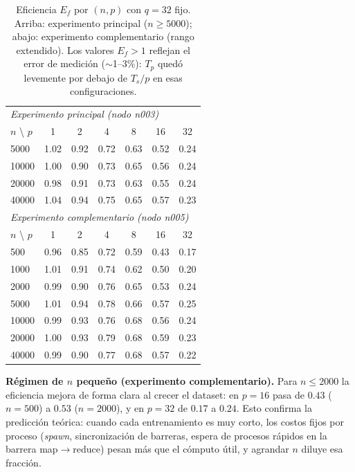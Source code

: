 \documentclass[11pt, a4paper]{article}
\begin{document}
\begin{table}[H]
\centering
\caption{Eficiencia $E_f$ por $(n, p)$ con $q = 32$ fijo. Arriba: experimento principal ($n \ge 5000$); abajo: experimento complementario (rango extendido). Los valores $E_f > 1$ reflejan el error de medición ($\sim$1--3\%): $T_p$ quedó levemente por debajo de $T_s/p$ en esas configuraciones.}
\label{tab:ef_n}
\small
\begin{tabular}{lcccccc}
\toprule
\multicolumn{7}{l}{\textit{Experimento principal (nodo n003)}} \\
$n$ \textbackslash{} $p$ & 1 & 2 & 4 & 8 & 16 & 32 \\
\midrule
5000  & 1.02 & 0.92 & 0.72 & 0.63 & 0.52 & 0.24 \\
10000 & 1.00 & 0.90 & 0.73 & 0.65 & 0.56 & 0.24 \\
20000 & 0.98 & 0.91 & 0.73 & 0.63 & 0.55 & 0.24 \\
40000 & 1.04 & 0.94 & 0.75 & 0.65 & 0.57 & 0.23 \\
\midrule
\multicolumn{7}{l}{\textit{Experimento complementario (nodo n005)}} \\
$n$ \textbackslash{} $p$ & 1 & 2 & 4 & 8 & 16 & 32 \\
\midrule
500   & 0.96 & 0.85 & 0.72 & 0.59 & 0.43 & 0.17 \\
1000  & 1.01 & 0.91 & 0.74 & 0.62 & 0.50 & 0.20 \\
2000  & 0.99 & 0.90 & 0.76 & 0.65 & 0.53 & 0.24 \\
5000  & 1.01 & 0.94 & 0.78 & 0.66 & 0.57 & 0.25 \\
10000 & 0.99 & 0.93 & 0.76 & 0.68 & 0.56 & 0.24 \\
20000 & 1.00 & 0.93 & 0.79 & 0.68 & 0.59 & 0.23 \\
40000 & 0.99 & 0.90 & 0.77 & 0.68 & 0.57 & 0.22 \\
\bottomrule
\end{tabular}
\end{table}

\textbf{Régimen de $n$ pequeño (experimento complementario).} Para $n \le 2000$ la eficiencia mejora de forma clara al crecer el dataset: en $p = 16$ pasa de $0.43$ ($n=500$) a $0.53$ ($n=2000$), y en $p = 32$ de $0.17$ a $0.24$. Esto confirma la predicción teórica: cuando cada entrenamiento es muy corto, los costos fijos por proceso (\textit{spawn}, sincronización de barreras, espera de procesos rápidos en la barrera map$\to$reduce) pesan más que el cómputo útil, y agrandar $n$ diluye esa fracción.
\end{document}
